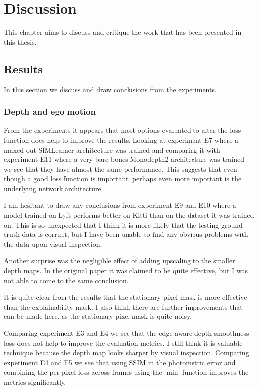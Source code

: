 \chapter{Discussion}\label{cha:discussion}

This chapter aims to discuss and critique the work that has been presented in this thesis. 

\section{Results}

In this section we discuss and draw conclusions from the experiments.

\subsection{Depth and ego motion}

From the experiments it appears that most options evaluated to alter the loss function does help to improve the results. Looking at experiment E7 where a maxed out SfMLearner architecture was trained and comparing it with experiment E11 where a very bare bones Monodepth2 architecture was trained we see that they have almost the same performance. This suggests that even though a good loss function is important, perhaps even more important is the underlying network architecture.

I am hesitant to draw any conclusions from experiment E9 and E10 where a model trained on Lyft performs better on Kitti than on the dataset it was trained on. This is so unexpected that I think it is more likely that the testing ground truth data is corrupt, but I have been unable to find any obvious problems with the data upon visual inspection.

Another surprise was the negligible effect of adding upscaling to the smaller depth maps. In the original paper it was claimed to be quite effective, but I was not able to come to the same conclusion.

It is quite clear from the results that the stationary pixel mask is more effective than the explainability mask. I also think there are further improvements that can be made here, as the stationary pixel mask is quite noisy.

Comparing experiment E3 and E4 we see that the edge aware depth smoothness loss does not help to improve the evaluation metrics. I still think it is valuable technique because the depth map looks sharper by visual inspection. Comparing experiment E4 and E5 we see that using SSIM in the photometric error and combining the per pixel loss across frames using the $\min$ function improves the metrics significantly.

